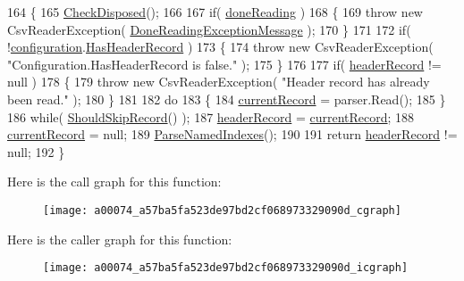 \begin{DoxyCode}
164         \{
165             \hyperlink{a00074_a6fa45a46ed1322dc1872ca2321b5edbc}{CheckDisposed}();
166 
167             \textcolor{keywordflow}{if}( \hyperlink{a00074_a04a4a668ae50f5383cdd2a1691bbd718}{doneReading} )
168             \{
169                 \textcolor{keywordflow}{throw} \textcolor{keyword}{new} CsvReaderException( \hyperlink{a00074_abea2bd0359f517019984de31f9d9fb96}{DoneReadingExceptionMessage} );
170             \}
171 
172             \textcolor{keywordflow}{if}( !\hyperlink{a00074_a695622911e45cbac8d67dcbd9a3e2967}{configuration}.\hyperlink{a00060_a9e439f90bfac500d24d6e2e731240439}{HasHeaderRecord} )
173             \{
174                 \textcolor{keywordflow}{throw} \textcolor{keyword}{new} CsvReaderException( \textcolor{stringliteral}{"Configuration.HasHeaderRecord is false."} );
175             \}
176 
177             \textcolor{keywordflow}{if}( \hyperlink{a00074_aa6e5fd8aa2961442ca1caf7a4ac54d65}{headerRecord} != null )
178             \{
179                 \textcolor{keywordflow}{throw} \textcolor{keyword}{new} CsvReaderException( \textcolor{stringliteral}{"Header record has already been read."} );
180             \}
181 
182             \textcolor{keywordflow}{do}
183             \{
184                 \hyperlink{a00074_ab2bfef15784add66e441c9d3a0d73751}{currentRecord} = parser.Read();
185             \}
186             \textcolor{keywordflow}{while}( \hyperlink{a00074_a3b8db0163b61e20d56ed8626e21338d6}{ShouldSkipRecord}() );
187             \hyperlink{a00074_aa6e5fd8aa2961442ca1caf7a4ac54d65}{headerRecord} = \hyperlink{a00074_ab2bfef15784add66e441c9d3a0d73751}{currentRecord};
188             \hyperlink{a00074_ab2bfef15784add66e441c9d3a0d73751}{currentRecord} = null;
189             \hyperlink{a00074_afc1150ed2f9ed7c9e87238e65a5e12e9}{ParseNamedIndexes}();
190 
191             \textcolor{keywordflow}{return} \hyperlink{a00074_aa6e5fd8aa2961442ca1caf7a4ac54d65}{headerRecord} != null;
192         \}
\end{DoxyCode}


Here is the call graph for this function\-:
\nopagebreak
\begin{figure}[H]
\begin{center}
\leavevmode
\texttt{[image: a00074\_a57ba5fa523de97bd2cf068973329090d\_cgraph]}
\end{center}
\end{figure}




Here is the caller graph for this function\-:
\nopagebreak
\begin{figure}[H]
\begin{center}
\leavevmode
\texttt{[image: a00074\_a57ba5fa523de97bd2cf068973329090d\_icgraph]}
\end{center}
\end{figure}


